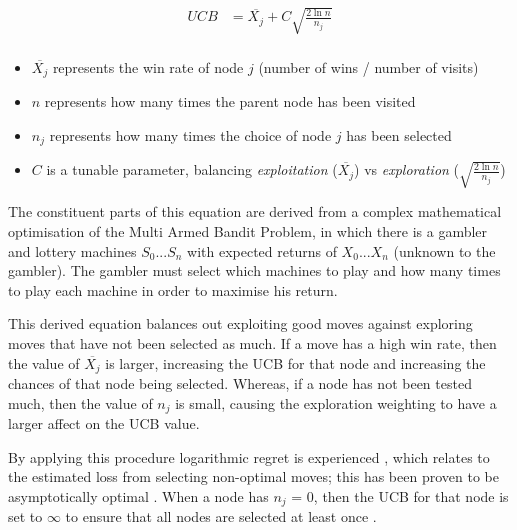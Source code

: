 \documentclass[12pt,a4paper]{article}
\begin{document}
\begin{equation} \label{eq1}
\begin{split}
UCB & = \overline{X_j} + C\sqrt{\frac{2\ln n}{n_j}}\\
\end{split}
\end{equation}

\begin{itemize}
     \item $\overline{X_j}$ represents the win rate of node $j$ (number of wins / number of visits)
     \item $n$ represents how many times the parent node has been visited 
     \item $n_j$ represents how many times the choice of node $j$ has been selected
     \item $C$ is a tunable parameter, balancing \textit{exploitation} ($\overline{X_j}$) vs \textit{exploration} ($\sqrt{\frac{2\ln n}{n_j}}$)
\end{itemize}

The constituent parts of this equation are derived from a complex mathematical optimisation of the Multi Armed Bandit Problem, in which there is a gambler and lottery machines $S_0...S_n$ with expected returns of $X_0...X_n$ (unknown to the gambler). The gambler must select which machines to play and how many times to play each machine in order to maximise his return.

This derived equation balances out exploiting good moves against exploring moves that have not been selected as much. If a move has a high win rate, then the value of $\overline{X_j}$ is larger, increasing the UCB for that node and increasing the chances of that node being selected. Whereas, if a node has not been tested much, then the value of $n_j$ is small, causing the exploration weighting to have a larger affect on the UCB value.

By applying this procedure logarithmic regret is experienced \cite{auer2002finite}, which relates to the estimated loss from selecting non-optimal moves; this has been proven to be asymptotically optimal \cite{lai1985asymptotically}. When a node has $n_j$ = 0, then the UCB for that node is set to $\infty$ to ensure that all nodes are selected at least once \cite{browne2012survey}. 

\end{document}
